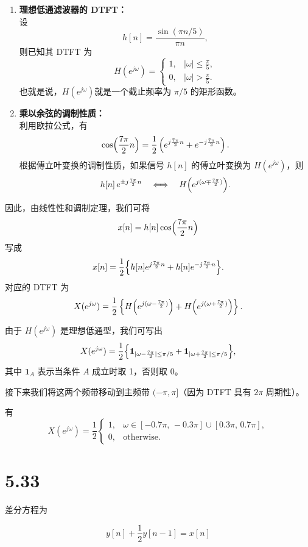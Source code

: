 \documentclass[11pt]{article}
\begin{document}
\begin{enumerate}
\def\labelenumi{\arabic{enumi}.}
\item
  \textbf{理想低通滤波器的 DTFT：}\\
  设 \[
  h[n] = \frac{\sin (\pi n/5)}{\pi n},
  \] 则已知其 DTFT 为 \[
  H(e^{j\omega}) =
  \begin{cases}
  1, & |\omega|\le \frac{\pi}{5},\\[1mm]
  0, & |\omega|> \frac{\pi}{5}.
  \end{cases}
  \] 也就是说，\(H(e^{j\omega})\)就是一个截止频率为 \(\pi/5\)
  的矩形函数。
\item
  \textbf{乘以余弦的调制性质：}\\
  利用欧拉公式，有 \[
  \cos\Bigl(\frac{7\pi}{2}n\Bigr) = \frac{1}{2}\left(e^{j\frac{7\pi}{2}n}+e^{-j\frac{7\pi}{2}n}\right).
  \] 根据傅立叶变换的调制性质，如果信号 \(h[n]\) 的傅立叶变换为
  \(H(e^{j\omega})\)，则 \[
  h[n]\,e^{\pm j\frac{7\pi}{2}n}\quad \Longleftrightarrow \quad H\Bigl(e^{j(\omega\mp \frac{7\pi}{2})}\Bigr).
  \]
\end{enumerate}

因此，由线性性和调制定理，我们可将 \[
x[n] = h[n]\cos\Bigl(\frac{7\pi}{2}n\Bigr)
\] 写成 \[
x[n] = \frac{1}{2}\Bigl\{ h[n]e^{j\frac{7\pi}{2}n} + h[n]e^{-j\frac{7\pi}{2}n}\Bigr\}.
\] 对应的 DTFT 为 \[
X(e^{j\omega}) = \frac{1}{2}\left\{ H\Bigl(e^{j(\omega - \frac{7\pi}{2})}\Bigr) + H\Bigl(e^{j(\omega + \frac{7\pi}{2})}\Bigr) \right\}.
\]

由于 \(H(e^{j\omega})\) 是理想低通型，我们可写出 \[
X(e^{j\omega}) = \frac{1}{2}\Bigl\{
\mathbf{1}_{|\omega-\frac{7\pi}{2}|\le \pi/5} + \mathbf{1}_{|\omega+\frac{7\pi}{2}|\le \pi/5}
\Bigr\},
\] 其中 \(\mathbf{1}_A\) 表示当条件 \(A\) 成立时取 1，否则取 0。

接下来我们将这两个频带移动到主频带 \((-\pi,\pi]\)（因为 DTFT 具有
\(2\pi\) 周期性）。

有 \[
X(e^{j\omega}) = \frac{1}{2}\left\{
\begin{array}{ll}
1,  & \omega \in [-0.7\pi,\,-0.3\pi] \cup [0.3\pi,\,0.7\pi],\\[1mm]
0,  & \text{otherwise}.
\end{array}
\right.
\]

    \section{5.33}\label{section}

差分方程为

\[
y[n] + \frac{1}{2}y[n - 1] = x[n]
\]
\end{document}
